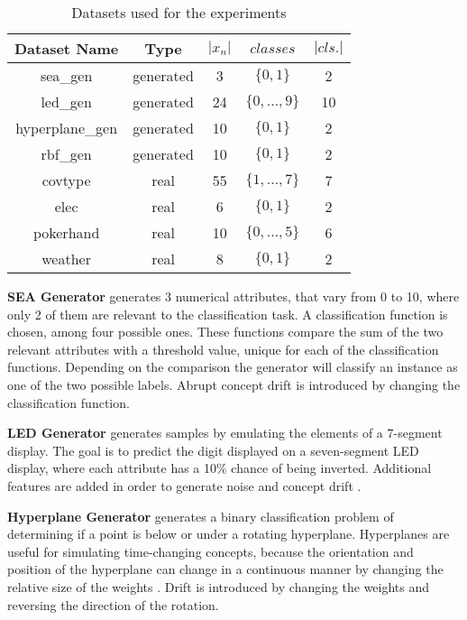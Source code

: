 \documentclass{sig-alternate-br}
\begin{document}
\begin{table}[h]
\centering
\renewcommand{\arraystretch}{1.25}
\begin{tabular}{|c|c|c|c|c|} \hline
\textbf{Dataset Name} & \textbf{Type} & \textbf{$|x_n|$} & \textbf{$classes$} & \textbf{$|cls.|$} \\ \hline
sea\_gen & generated & 3 & $\{0, 1\}$ & 2 \\ \hline
led\_gen & generated & 24 & $\{0,\dots,9\}$ & 10 \\ \hline
hyperplane\_gen & generated & 10 & $\{0, 1\}$ & 2\\ \hline
rbf\_gen & generated & 10 & $\{0, 1\}$ & 2\\ \hline
covtype & real & 55 & $\{1,\dots,7\}$ & 7 \\ \hline
elec & real & 6 & $\{0, 1\}$ & 2 \\ \hline
pokerhand & real & 10 & $\{0,\dots,5\}$ & 6 \\ \hline
weather & real & 8 & $\{0, 1\}$ & 2 \\ \hline
\end{tabular}
\caption{Datasets used for the experiments}
\label{table:datasets}
\end{table}

\textbf{SEA Generator} generates 3 numerical attributes, that vary from 0 to 10, where 
    only 2 of them are relevant to the classification task. A classification 
    function is chosen, among four possible ones. These functions compare 
    the sum of the two relevant attributes with a threshold value, unique 
    for each of the classification functions.\cite{street2001streaming} Depending on the comparison 
    the generator will classify an instance as one of the two possible 
    labels. Abrupt concept drift is introduced by changing the classification function.

\textbf{LED Generator} generates samples by emulating the elements of a 7-segment display.
    The goal is to predict the digit displayed on a seven-segment LED display,
    where each attribute has a 10\% chance of being inverted. Additional features are added
    in order to generate noise and concept drift \cite{breiman1984classification}.

\textbf{Hyperplane Generator} generates a binary classification problem of determining if a point is below or under a rotating hyperplane.
    Hyperplanes are useful for simulating time-changing concepts, because the
    orientation and position of the hyperplane can change in a continuous manner
    by changing the relative size of the weights \cite{hulten2001mining}. Drift
    is introduced by changing the weights and reversing the direction of the rotation.
    
\end{document}
